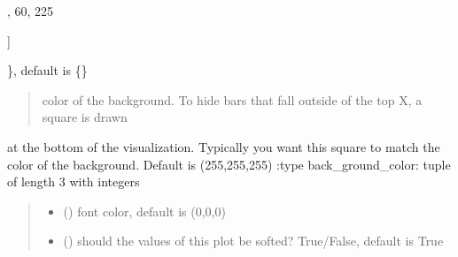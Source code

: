 \documentclass[letterpaper,10pt,english]{sphinxmanual}
\begin{document}
\begin{fulllineitems}
\begin{quote}
\begin{description}
\begin{itemize}
\end{itemize}

\end{description}\end{quote}
\begin{description}
\begin{description}
\sphinxlineitem{\{}\begin{description}
\sphinxlineitem{“United States”: {[}}
,
60,
225

\end{description}

\sphinxAtStartPar
{]}

\end{description}

\sphinxAtStartPar
\}, default is \{\}

\end{description}
\begin{quote}\begin{description}
\sphinxAtStartPar
{} \textendash{} color of the background. To hide bars that fall outside of the top X, a square is drawn

\end{description}\end{quote}

\sphinxAtStartPar
at the bottom of the visualization. Typically you want this square to match the color of the background. Default is (255,255,255)
:type back\_ground\_color: tuple of length 3 with integers
\begin{quote}\begin{description}
\begin{itemize}
\item {} 
\sphinxAtStartPar
{} () \textendash{} font color, default is (0,0,0)

\item {} 
\sphinxAtStartPar
{} () \textendash{} should the values of this plot be softed? True/False, default is True


\end{itemize}
\end{description}
\end{quote}
\end{fulllineitems}
\end{document}
